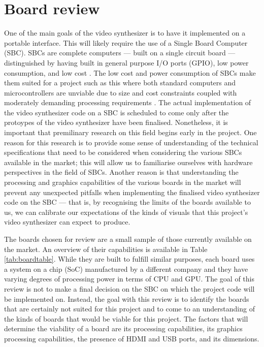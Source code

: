 \documentclass[../main_report2.tex]{subfiles}
\begin{document}
\section{Board review}\label{sec:boardreview}
One of the main goals of the video synthesizer is to have it implemented on a portable interface. This will likely require the use of a Single Board Computer (SBC). SBCs are complete computers --- built on a single circuit board --- distinguished by having built in general purpose I/O ports (GPIO), low power consumption, and low cost \cite{Johnston2018}. The low cost and power consumption of SBCs make them suited for a project such as this where both standard computers and microcontrollers are unviable due to size and cost constraints coupled with moderately demanding processing requirements \cite{Johnston2018}. The actual implementation of the video synthesizer code on a SBC is scheduled to come only after the protoypes of the video synthesizer have been finalised. Nonetheless, it is important that premilinary research on this field begins early in the project. One reason for this research is to provide some sense of understanding of the technical specifications that need to be considered when considering the various SBCs available in the market; this will allow us to familiarise ourselves with hardware perspectives in the field of SBCs. Another reason is that understanding the processing and graphics capabilities of the various boards in the market will prevent any unexpected pitfalls when implementing the finalised video synthesizer code on the SBC --- that is, by recognising the limits of the boards available to us, we can calibrate our expectations of the kinds of visuals that this project's video synthesizer can expect to produce. \par

The boards chosen for review are a small sample of those currently available on the market. An overview of their capabilities is available in Table \ref{tab:boardtable}. While they are built to fulfill similar purposes, each board uses a system on a chip (SoC) manufactured by a different company and they have varying degrees of processing power in terms of CPU and GPU. The goal of this review is not to make a final decision on the SBC on which the project code will be implemented on. Instead, the goal with this review is to identify the boards that are certainly not suited for this project and to come to an understanding of the kinds of boards that would be viable for this project. The factors that will determine the viability of a board are its processing capabilities, its graphics processing capabilities, the presence of HDMI and USB ports, and its dimensions. \par
\end{document}
